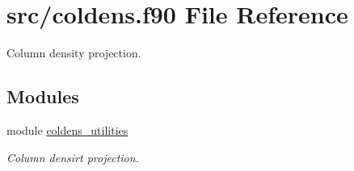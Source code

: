 \hypertarget{coldens_8f90}{}\section{src/coldens.f90 File Reference}
\label{coldens_8f90}


Column density projection.  


\subsection*{Modules}
\begin{DoxyCompactItemize}
\item 
module \hyperlink{namespacecoldens__utilities}{coldens\+\_\+utilities}
\begin{DoxyCompactList}\small\item\em Column densirt projection. \end{DoxyCompactList}\end{DoxyCompactItemize}

